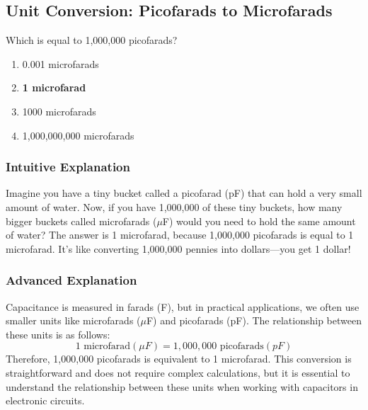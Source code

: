 \subsection{Unit Conversion: Picofarads to Microfarads}
\label{T5B08}

\begin{tcolorbox}[colback=gray!10!white,colframe=black!75!black,title=T5B08]
Which is equal to 1,000,000 picofarads?
\begin{enumerate}[noitemsep]
    \item 0.001 microfarads
    \item \textbf{1 microfarad}
    \item 1000 microfarads
    \item 1,000,000,000 microfarads
\end{enumerate}
\end{tcolorbox}

\subsubsection*{Intuitive Explanation}
Imagine you have a tiny bucket called a picofarad (pF) that can hold a very small amount of water. Now, if you have 1,000,000 of these tiny buckets, how many bigger buckets called microfarads ($\mu$F) would you need to hold the same amount of water? The answer is 1 microfarad, because 1,000,000 picofarads is equal to 1 microfarad. It's like converting 1,000,000 pennies into dollars—you get 1 dollar!

\subsubsection*{Advanced Explanation}
Capacitance is measured in farads (F), but in practical applications, we often use smaller units like microfarads ($\mu$F) and picofarads (pF). The relationship between these units is as follows:
\[
1 \text{ microfarad} (\mu F) = 1,000,000 \text{ picofarads} (pF)
\]
Therefore, 1,000,000 picofarads is equivalent to 1 microfarad. This conversion is straightforward and does not require complex calculations, but it is essential to understand the relationship between these units when working with capacitors in electronic circuits.